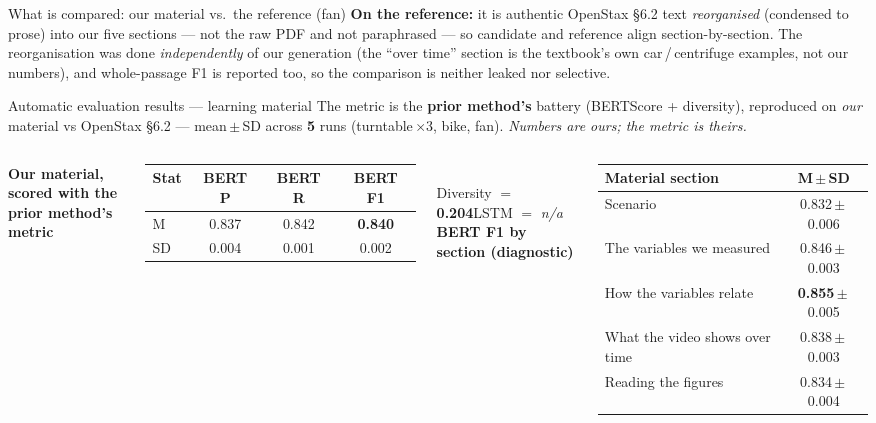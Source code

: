 \documentclass[aspectratio=169,10pt]{beamer}
\newcommand{\hl}[1]{{\bfseries\color{cAccent}#1}}
\begin{document}
\begin{frame}{What is compared: our material vs.\ the reference (fan)}
{\scriptsize \textbf{On the reference:} it is authentic OpenStax \S6.2 text \emph{reorganised} (condensed to prose) into our five sections --- not the raw PDF and not paraphrased --- so candidate and reference align section-by-section. The reorganisation was done \emph{independently} of our generation (the ``over time'' section is the textbook's own car\,/\,centrifuge examples, not our numbers), and whole-passage F1 is reported too, so the comparison is neither leaked nor selective.}
\end{frame}

\begin{frame}{Automatic evaluation results --- learning material}
\small
The metric is the \textbf{prior method's} battery (BERTScore + diversity), reproduced on \emph{our} material vs OpenStax \S6.2 --- mean\,$\pm$\,SD across \hl{5} runs (turntable\,$\times$3, bike, fan). \emph{Numbers are ours; the metric is theirs.}
\vspace{0.2em}
\begin{columns}[T]
\centering
{\footnotesize\textbf{Our material, scored with the prior method's metric}}\\[2pt]
{\footnotesize
\begin{tabular}{lccc}
\toprule
\textbf{Stat} & \textbf{BERT P} & \textbf{BERT R} & \textbf{BERT F1} \\
\midrule
M  & 0.837 & 0.842 & \hl{0.840} \\
SD & 0.004 & 0.001 & 0.002 \\
\bottomrule
\end{tabular}}\\[4pt]
{\footnotesize Diversity $=$ \textbf{0.204}\quad LSTM $=$ \emph{n/a}}
\centering
{\footnotesize\textbf{BERT F1 by section (diagnostic)}}\\[2pt]
{\footnotesize
\begin{tabular}{lc}
\toprule
\textbf{Material section} & \textbf{M\,$\pm$\,SD} \\
\midrule
Scenario                       & 0.832\,$\pm$\,0.006 \\
The variables we measured      & 0.846\,$\pm$\,0.003 \\
How the variables relate       & \hl{0.855}\,$\pm$\,0.005 \\
What the video shows over time & 0.838\,$\pm$\,0.003 \\
Reading the figures            & 0.834\,$\pm$\,0.004 \\
\bottomrule
\end{tabular}}

\end{columns}
\end{frame}
\end{document}
